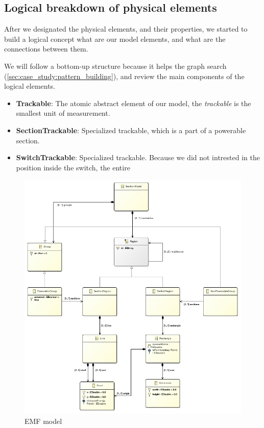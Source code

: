 \subsection{Logical breakdown of physical elements}
After we designated the physical elements, and their properties, we started to build a logical concept what are our model elements, and what are the connections between them.

We will follow a bottom-up structure because it helps the graph search (\cref{sec:case_study:pattern_building}), and review the main components of the logical elements.


\begin{itemize}
	\item \textbf{Trackable}: The atomic abstract element of our model, the \emph{trackable} is the smallest unit of measurement.
	\item \textbf{SectionTrackable}: Specialized trackable, which is a part of a powerable section.
	\item \textbf{SwitchTrackable}: Specialized trackable. Because we did not intrested in the position inside the switch, the entire
\end{itemize}

\begin{figure}[p]
	\centering
	\includegraphics[width=\linewidth]{include/figures/chapter_6/sectionmodel}
	\caption{EMF model} 
	\label{fig:case_study:model}
\end{figure}

